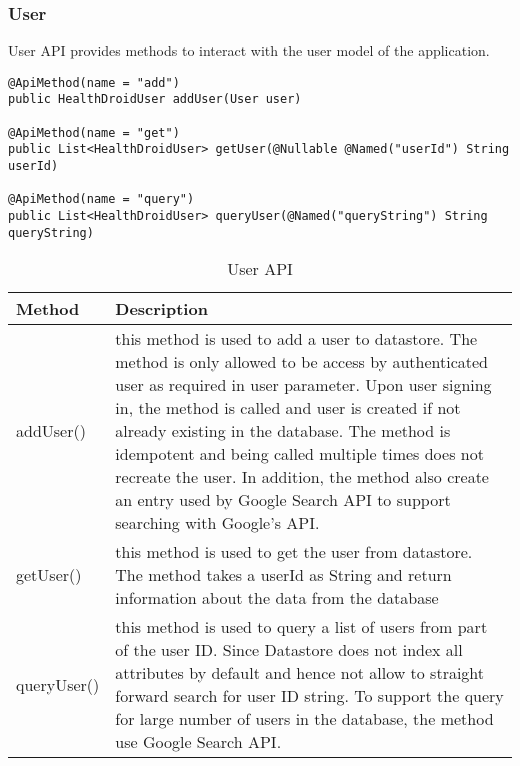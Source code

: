 \subsubsection{User}
User API provides methods to interact with the user model of the application.
\begin{minipage}{\linewidth}
\begin{lstlisting}
@ApiMethod(name = "add")
public HealthDroidUser addUser(User user)

@ApiMethod(name = "get")
public List<HealthDroidUser> getUser(@Nullable @Named("userId") String userId)

@ApiMethod(name = "query")
public List<HealthDroidUser> queryUser(@Named("queryString") String queryString)
\end{lstlisting}
\end{minipage}

\begin{table}
\begin{center}
    \begin{tabularx}{\textwidth}{| l | X |}
        \hline Method & Description \\
        \hline addUser() & 
            this method is used to add a user to datastore. The method is only allowed to be access by
            authenticated user as required in user parameter. Upon user signing in, the method is called and user is
            created if not already existing in the database. The method is idempotent and being called multiple times
            does not recreate the user. In addition, the method also create an entry used by Google Search API to
            support searching with Google's API.  \\
        \hline getUser() &
            this method is used to get the user from datastore. The method takes a userId as String and return
            information about the data from the database \\
        \hline queryUser() &
            this method is used to query a list of users from part of the user ID. Since Datastore does not index all
            attributes by default and hence not allow to straight forward search for user ID string. To support the
            query for large number of users in the database, the method use Google Search API. \\
        \hline
    \end{tabularx}
\end{center}
    \caption{User API}
\end{table}

